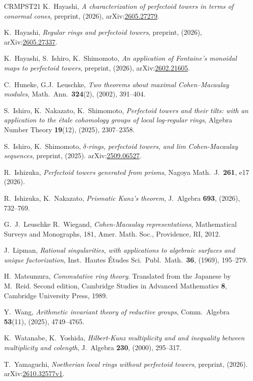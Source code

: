 \documentclass[uplatex,11pt,a4paper]{amsart} %
\numberwithin{equation}{section}
\numberwithin{figure}{section}
\numberwithin{table}{section}
\theoremstyle{plain}
\theoremstyle{definition}
\begin{document}
\begin{thebibliography}{CRMPST21}
K.~Hayashi,
\emph{A characterization of perfectoid towers in terms of conormal cones},
preprint, (2026),
arXiv:\href{https://arxiv.org/abs/2605.27279}{2605.27279}.

K.~Hayashi,
\emph{Regular rings and perfectoid towers},
preprint, (2026),
arXiv:\href{https://arxiv.org/abs/2605.27337}{2605.27337}.

K.~Hayashi, S.~Ishiro, K.~Shimomoto,
\emph{An application of Fontaine's monoidal maps to perfectoid towers},
preprint, (2026),
arXiv:\href{https://arxiv.org/abs/2602.21605}{2602.21605}.

C.~Huneke, G.J.~Leuschke,
\emph{Two theorems about maximal Cohen--Macaulay modules},
Math.\ Ann.\ \textbf{324}(2), (2002), 391--404.

S.~Ishiro, K.~Nakazato, K.~Shimomoto,
\emph{Perfectoid towers and their tilts: with an application to the \'{e}tale cohomology groups of local log-regular rings},
Algebra Number Theory \textbf{19}(12), (2025), 2307--2358.

S.~Ishiro, K.~Shimomoto,
\emph{$\delta$-rings, perfectoid towers, and lim Cohen-Macaulay sequences},
preprint, (2025).
arXiv:\href{https://arxiv.org/abs/2509.06527}{2509.06527}.

R.~Ishizuka,
\emph{Perfectoid towers generated from prisms},
Nagoya Math.\ J.\ \textbf{261}, e17 (2026).

R.~Ishizuka, K.~Nakazato,
\emph{Prismatic Kunz's theorem},
J.\ Algebra \textbf{693}, (2026), 732--769.

G.~J.~Leuschke R.~Wiegand,
\emph{Cohen-Macaulay representations},
Mathematical Surveys and Monographs, 181, Amer. Math. Soc., Providence, RI, 2012.

J.~Lipman,
\emph{Rational singularities, with applications to algebraic surfaces and unique factorization},
Inst.\ Hautes \'Etudes Sci.\ Publ.\ Math.\ \textbf{36}, (1969), 195--279.

H.~Matsumura,
\emph{Commutative ring theory}.
Translated from the Japanese by M.~Reid. Second edition,
Cambridge Studies in Advanced Mathematics \textbf{8}, Cambridge University Press, 1989.

Y.~Wang,
\emph{Arithmetic invariant theory of reductive groups},
Comm.\ Algebra \textbf{53}(11), (2025), 4749--4765.

K.~Watanabe, K.~Yoshida,
\emph{Hilbert-Kunz multiplicity and and inequality between multiplicity and colength},
J.\ Algebra \textbf{230}, (2000), 295--317.

T.~Yamaguchi,
\emph{Noetherian local rings without perfectoid towers},
preprint, (2026).
arXiv:\href{https://arxiv.org/abs/2610.32577v1}{2610.32577v1}.
\end{thebibliography}
\end{document}
